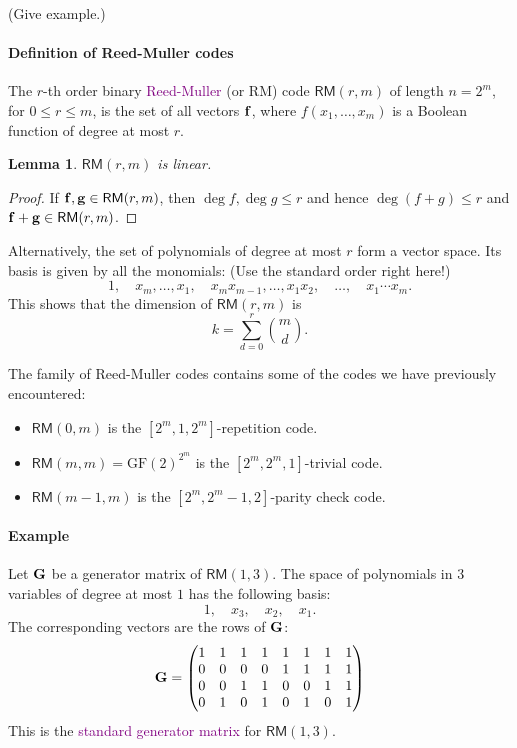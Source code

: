 \documentclass[a4paper, 11pt, openany]{book}
\numberwithin{equation}{section}
\theoremstyle{plain}
\newtheorem{lemma}		[equation]	{Lemma}
\theoremstyle{definition}
\newcommand{\GF}{\mathrm{GF}}
\newcommand{\Define}[1]{\textcolor{purple}{#1}}
\newcommand{\code}[1]{\mathsf{#1}}
\newcommand{\ReedMuller}            {\code{RM}}
\begin{document}
(Give example.)

\paragraph{Definition of Reed-Muller codes}
The $r$-th order binary \Define{Reed-Muller} (or RM) code $\ReedMuller(r,m)$ of length $n = 2^m$, for $0 \le r \le m$, is the set of all vectors ${\bf f}$, where $f(x_1, \dots, x_m)$ is a Boolean function of degree at most $r$.

\begin{lemma} 
$\ReedMuller(r,m)$ is linear.
\end{lemma}

\begin{proof}
If ${\bf f}, {\bf g} \in \ReedMuller(r,m)$, then $\deg f, \deg g \le r$ and hence $\deg (f+g) \le r$ and ${\bf f} + {\bf g} \in \ReedMuller(r,m)$.
\end{proof}

Alternatively, the set of polynomials of degree at most $r$ form a vector space. Its basis is given by all the monomials: (Use the standard order right here!)
\[
	1, \quad x_m, \dots, x_1, \quad x_m x_{m-1}, \dots, x_1 x_2, \quad \dots, \quad x_1 \cdots x_m.
\]
This shows that the dimension of $\ReedMuller(r,m)$ is
\[
	k = \sum_{d=0}^r \binom{m}{d}.
\]



The family of Reed-Muller codes contains some of the codes we have previously encountered:
\begin{itemize}
    \item $\ReedMuller(0,m)$ is the $[2^m, 1, 2^m]$-repetition code.

    \item $\ReedMuller(m,m) = \GF(2)^{2^m}$ is the $[2^m, 2^m, 1]$-trivial code.

    \item $\ReedMuller(m-1,m)$ is the $[2^m, 2^m - 1, 2]$-parity check code.
\end{itemize}


\paragraph{Example}
Let ${\bf G}$ be a generator matrix of $\ReedMuller(1,3)$. The space of polynomials in $3$ variables of degree at most $1$ has the following basis:
\[
	1, \quad x_3, \quad x_2, \quad x_1.
\]
The corresponding vectors are the rows of ${\bf G}$:
\[
	{\bf G} = \begin{pmatrix}
	1 & 1 & 1 & 1 & 1 & 1 & 1 & 1 \\
	0 & 0 & 0 & 0 & 1 & 1 & 1 & 1 \\
	0 & 0 & 1 & 1 & 0 & 0 & 1 & 1 \\
	0 & 1 & 0 & 1 & 0 & 1 & 0 & 1 
	\end{pmatrix}
\]
This is the \Define{standard generator matrix} for $\ReedMuller(1,3)$.
\end{document}

